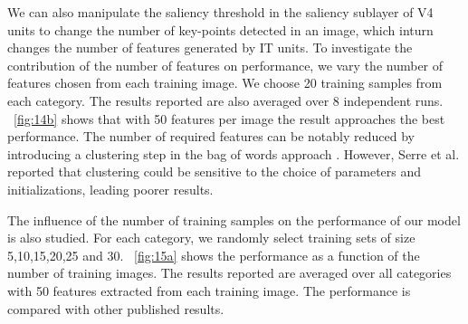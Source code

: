 \documentclass[5p]{elsarticle}
\begin{document}
We can also manipulate the saliency threshold in the saliency sublayer of V4 units
to change the number of key-points detected in an image,
which inturn changes the number of features generated by IT units.
To investigate the contribution of the number of features on performance,
we vary the number of features chosen from each training image.
We choose 20 training samples from each category.
The results reported are also averaged over 8 independent runs.
\figurename~\ref{fig:14b} shows that 
with 50 features per image the result approaches the best performance.
The number of required features can be notably reduced by introducing 
a clustering step in the bag of words approach \cite{csurka2004}.
However, Serre et al. \cite{serre2007} reported that clustering could
be sensitive to the choice of parameters and initializations,
leading poorer results.

The influence of the number of training samples 
on the performance of our model is also studied.
For each category, we randomly select training sets of size
5,10,15,20,25 and 30.
\figurename~\ref{fig:15a} shows the performance as
a function of the number of training images.
The results reported are averaged over all categories
with 50 features extracted from each training image.
The performance is compared with other published results.
\end{document}
